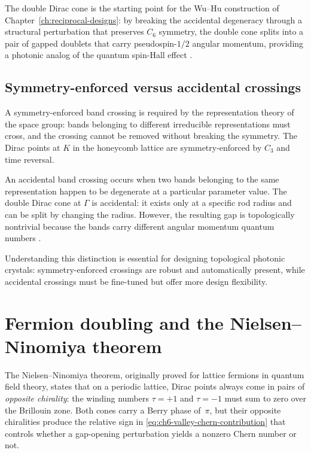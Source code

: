 The double Dirac cone is the starting point for the Wu--Hu
construction of Chapter~\ref{ch:reciprocal-designs}: by breaking the
accidental degeneracy through a structural perturbation that preserves
$C_6$ symmetry, the double cone splits into a pair of gapped doublets
that carry pseudospin-$1/2$ angular momentum, providing a photonic
analog of the quantum spin-Hall effect
\cite{ozawa2018topological,price2022roadmap,kang2018pseudo}.

\subsection{Symmetry-enforced versus accidental crossings}
\label{sec:ch6-enforced-vs-accidental}

A symmetry-enforced band crossing is required by the representation
theory of the space group: bands belonging to different irreducible
representations must cross, and the crossing cannot be removed without
breaking the symmetry.  The Dirac points at $K$ in the honeycomb
lattice are symmetry-enforced by $C_3$ and time reversal.

An accidental band crossing occurs when two bands belonging to the
same representation happen to be degenerate at a particular parameter
value.  The double Dirac cone at $\Gamma$ is accidental: it exists
only at a specific rod radius and can be split by changing the radius.
However, the resulting gap is topologically nontrivial because the
bands carry different angular momentum quantum numbers
\cite{bliokh2015quantum,ozawa2018topological}.

Understanding this distinction is essential for designing topological
photonic crystals: symmetry-enforced crossings are robust and
automatically present, while accidental crossings must be fine-tuned
but offer more design flexibility.

\section{Fermion doubling and the Nielsen--Ninomiya theorem}
\label{sec:ch6-fermion-doubling-detail}

The Nielsen--Ninomiya theorem, originally proved for lattice fermions
in quantum field theory, states that on a periodic lattice, Dirac
points always come in pairs of \emph{opposite chirality}: the winding
numbers $\tau=+1$ and $\tau=-1$ must sum to zero over the Brillouin
zone.  Both cones carry a Berry phase of~$\pi$, but their opposite
chiralities produce the relative sign in
\eqref{eq:ch6-valley-chern-contribution} that controls whether a
gap-opening perturbation yields a nonzero Chern number or not.

